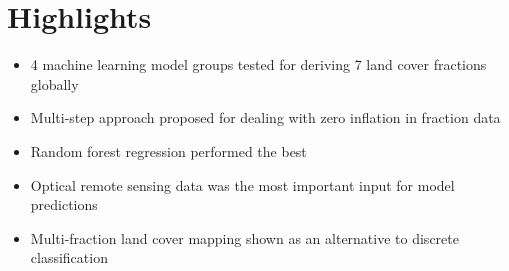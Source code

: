 \documentclass[review,authoryear,3p]{elsarticle}
\begin{document}
\section*{Highlights}
\begin{itemize}
    \item 4 machine learning model groups tested for deriving 7 land cover fractions globally
    \item Multi-step approach proposed for dealing with zero inflation in fraction data
    \item Random forest regression performed the best
    \item Optical remote sensing data was the most important input for model predictions
    \item Multi-fraction land cover mapping shown as an alternative to discrete classification
\end{itemize}
\end{document}
